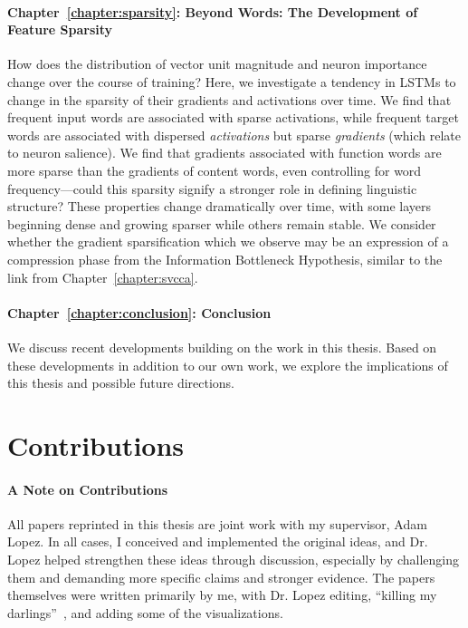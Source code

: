 \paragraph*{Chapter~\ref{chapter:sparsity}: Beyond Words: The Development of Feature Sparsity} How does the distribution of vector unit magnitude and neuron importance change over the course of training? Here, we  investigate a tendency in LSTMs to change in the sparsity of their gradients and activations over time. We find that frequent input words are associated with sparse activations, while frequent target words are associated with dispersed \textit{activations} but sparse \textit{gradients} (which relate to neuron salience). We find that gradients associated with function words are more sparse than the gradients of content words, even controlling for word frequency---could this sparsity signify a stronger role in defining linguistic structure? These properties change dramatically over time, with some layers beginning dense and growing sparser while others remain stable. We consider whether the gradient sparsification which we observe may be an expression of a compression phase from the Information Bottleneck Hypothesis, similar to the link from Chapter~\ref{chapter:svcca}.

\paragraph*{Chapter~\ref{chapter:conclusion}: Conclusion} We discuss recent developments building on the work in this thesis. Based on these developments in addition to our own work, we explore the implications of this thesis and possible future directions.

\section{Contributions}

\paragraph*{A Note on Contributions } All papers reprinted in this thesis are joint work with my supervisor, Adam Lopez. In all cases, I conceived and implemented the original ideas, and Dr. Lopez helped strengthen these ideas through discussion, especially by challenging them and demanding more specific claims and stronger evidence. The papers themselves were written primarily by me, with Dr. Lopez editing, ``killing my darlings''~\citep{quiller-crouch_art_1916}, and adding some of the visualizations.


